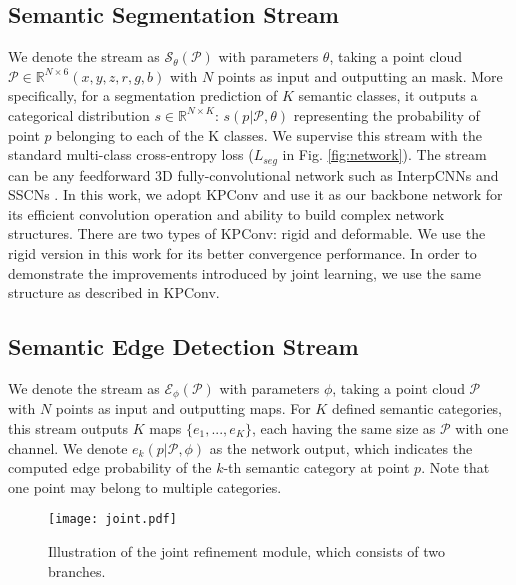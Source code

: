 \documentclass[runningheads]{llncs}
\begin{document}
\subsection{{Semantic} Segmentation Stream} \label{Segmentation stream}

We denote the 
{{\SemSeg} stream} as $\mathcal{S_\theta(\mathcal{P})}$ with parameters $\theta$, {taking a}
point cloud $\mathcal{P} \in \mathbb{R}^{N \times 6}(x,y,z,r,g,b)$ with $N$ points as input and outputting {an} {\SemSegPoint} mask.
More {specifically},
for a segmentation prediction of $K$ semantic classes, it outputs a categorical distribution $s \in \mathbb{R}^{N \times K}${:}
$s(p|\mathcal{P},\theta)$ 
{representing} the probability of point $p$ 
{belonging} to each of the K classes. We supervise this stream with the standard multi-class cross-entropy loss ({$L_{seg}$ in Fig. \ref{fig:network}}). The {{\SemSeg}} stream can be any feedforward 3D fully-convolutional {\SemSeg} network such as InterpCNNs \cite{mao2019interpolated} and SSCNs \cite{graham20183d}. In this work, we adopt KPConv \cite{thomas2019kpconv} and use it as our backbone network for its {efficient convolution operation} and ability to build complex network structures. {There are two types of KPConv: rigid and deformable. We use the rigid version in this work for its better convergence performance.} In order to demonstrate the improvements introduced by joint learning, we use the same structure as described in KPConv.



\subsection{{Semantic} Edge Detection Stream
} \label{Semantic edge detection stream}
We denote the {{\SemEdgeD}} stream as $\mathcal{E_\phi(\mathcal{P})}$ with parameters $\phi$, taking a point cloud {$\mathcal{P}$} with $N$ points as input and outputting {\SemEdgePoint} maps. For 
$K$ defined semantic categories, {this} stream output{s} $K$ {{\SemEdgePoint}} maps $\{e_1,...,e_K\}$, each having the same size as $\mathcal{P}$ {with one channel}. We denote $e_k(p|\mathcal{P},\phi)$ as the network output, which indicates the computed edge probability 
{of}
the $k$-th semantic category at point $p$. Note that one point
{may} belong to multiple categories. 


\begin{figure*}[ht]
    \centering
    \texttt{[image: joint.pdf]}
    \caption{
    {Illustration of the joint refinement module, which} 
consists of two branches.
}
    \label{fig:joint}
\end{figure*}
\end{document}
